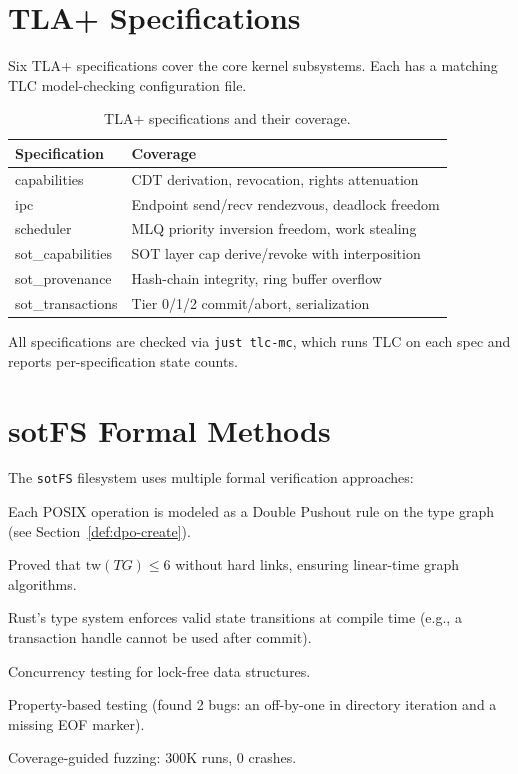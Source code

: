\documentclass[11pt,a4paper,twoside]{report}
\theoremstyle{definition}
\newcommand{\sotFS}{\texttt{sotFS}}
\begin{document}
\section{TLA+ Specifications}

Six TLA+ specifications cover the core kernel subsystems. Each has a
matching TLC model-checking configuration file.

\begin{table}[H]
\centering
\caption{TLA+ specifications and their coverage.}
\begin{tabularx}{\textwidth}{l X}
\toprule
\textbf{Specification} & \textbf{Coverage} \\
\midrule
capabilities        & CDT derivation, revocation, rights attenuation \\
ipc                 & Endpoint send/recv rendezvous, deadlock freedom \\
scheduler           & MLQ priority inversion freedom, work stealing \\
sot\_capabilities    & SOT layer cap derive/revoke with interposition \\
sot\_provenance      & Hash-chain integrity, ring buffer overflow \\
sot\_transactions    & Tier 0/1/2 commit/abort, serialization \\
\bottomrule
\end{tabularx}
\end{table}

All specifications are checked via \texttt{just tlc-mc}, which runs TLC on
each spec and reports per-specification state counts.

\section{sotFS Formal Methods}

The \sotFS{} filesystem uses multiple formal verification approaches:

\begin{description}[leftmargin=1.4em]
  \item[DPO Rewriting.] Each POSIX operation is modeled as a Double Pushout
    rule on the type graph (see Section~\ref{def:dpo-create}).
  \item[Bounded Treewidth.] Proved that $\mathrm{tw}(TG) \leq 6$ without
    hard links, ensuring linear-time graph algorithms.
  \item[Typestate.] Rust's type system enforces valid state transitions at
    compile time (e.g., a transaction handle cannot be used after commit).
  \item[loom.] Concurrency testing for lock-free data structures.
  \item[proptest.] Property-based testing (found 2 bugs: an off-by-one in
    directory iteration and a missing EOF marker).
  \item[cargo-fuzz.] Coverage-guided fuzzing: 300K runs, 0 crashes.
\end{description}
\end{document}

